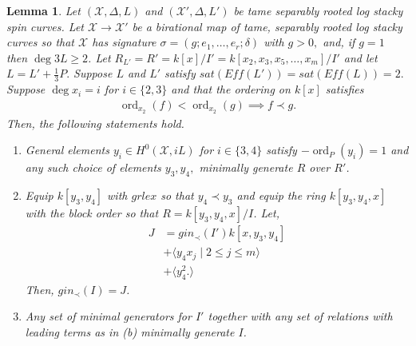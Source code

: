 \documentclass{amsart}
\theoremstyle{plain}
\newtheorem{lem}[thm]{Lemma}
\theoremstyle{definition}
\theoremstyle{remark}
\numberwithin{equation}{section}
\newcommand \sx{\mathscr X}
\DeclareMathOperator{\ord}{ord}
\begin{document}
\begin{lem}
\label{lem:sat_two_induction}
Let $(\sx, \Delta, L)$ and $(\sx', \Delta, L')$ be tame separably rooted log stacky spin curves. 
Let $\sx \rightarrow \sx'$ be a birational map of tame, separably rooted log stacky curves so that $\sx$ has signature 
$\sigma = (g;e_1,\ldots, e_r;\delta)$ with $g > 0,$ and, if $g = 1$ then $\deg 3L \geq 2$.
Let $R_{L'} = R' = k[x]/I'= k[x_2, x_3
, x_5,\ldots, x_m]/I'$ and let $L = L' + \frac{1}{
3}P.$ Suppose $L$ and $L'$ satisfy $sat(Eff(L')) = sat(Eff(L)) = 2.$
Suppose $\deg x_i = i$ for $i \in \{2, 3\}$ and that the ordering on $k[x]$ satisfies
\begin{align*}
	\ord_{x_2}(f) < \ord_{x_2}(g) \implies f \prec g.
\end{align*}
Then, the following statements hold.
\begin{enumerate}
	\item[(a)] General elements  $y_i \in H^0(\sx,iL)$ for $i \in \{3, 4\}$ satisfy $-\ord_P(y_i) = 1$ and any such choice of elements $y
		_3,y_4,$ minimally generate $R$ over $R'$.
	\item[(b)] Equip $k[y_3, y_4]$ with $grlex$ so that $y_4 \prec 
		y_3$
		and equip the ring $k[y_3, y_4, x]$ with the block 
		order so that $R = k[y_3, y_4, x]/I$. Let,
		\begin{align*}
			J &= gin_\prec(I')k[x, y_3, y_4] \\
			&+\langle y_4 x_j \mid 2 \leq j \leq m \rangle \\
			&+\langle y_4^2.\rangle
		\end{align*}
			Then, $gin_\prec(I) = J$.
	\item[(c)] Any set of minimal generators for $I'$ together with 
		any set of relations with leading terms as in (b) minimally 
		generate $I$.
\end{enumerate}
\end{lem}
\end{document}
